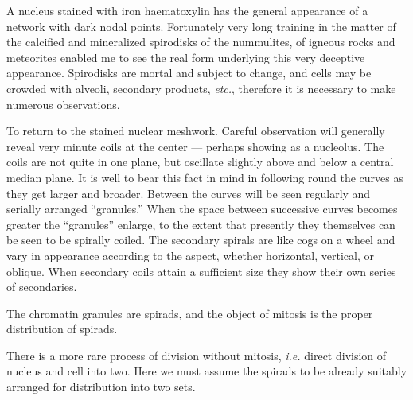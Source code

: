 \documentclass[a4paper, 12pt, oneside]{article}
\begin{document}
A nucleus stained with iron haematoxylin has the general appearance of a network with dark nodal points. Fortunately very long training in the matter of the calcified and mineralized spirodisks of the nummulites, of igneous rocks and meteorites enabled me to see the real form underlying this very deceptive appearance. Spirodisks are mortal and subject to change, and cells may be crowded with alveoli, secondary products, \emph{etc.}, therefore it is necessary to make numerous observations.

To return to the stained nuclear meshwork. Careful observation will generally reveal very minute coils at the center --- perhaps showing as a nucleolus. The coils are not quite in one plane, but oscillate slightly above and below a central median plane. It is well to bear this fact in mind in following round the curves as they get larger and broader. Between the curves will be seen regularly and serially arranged ``granules.'' When the space between successive curves becomes greater the ``granules'' enlarge, to the extent that presently they themselves can be seen to be spirally coiled. The secondary spirals are like cogs on a wheel and vary in appearance according to the aspect, whether horizontal, vertical, or oblique. When secondary coils attain a sufficient size they show their own series of secondaries.

The chromatin granules are spirads, and the object of mitosis is the proper distribution of spirads.

There is a more rare process of division without mitosis, \emph{i.e.} direct division of nucleus and cell into two. Here we must assume the spirads to be already suitably arranged for distribution into two sets.
\end{document}
